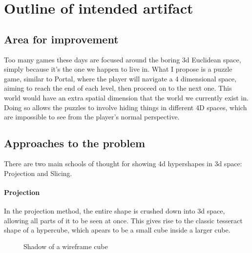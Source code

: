 \documentclass[12pt]{article}
\begin{document}
\maketitle

\section{Outline of intended artifact}
\subsection{Area for improvement}
Too many games these days are focused around the boring 3d Euclidean space, simply because it's the one we happen to live in.
What I propose is a puzzle game, similar to Portal, where the player will navigate a 4 dimensional space, aiming to reach the end of each level, then proceed on to the next one.
This world would have an extra spatial dimension that the world we currently exist in. 
Doing so allows the puzzles to involve hiding things in different 4D spaces, which are impossible to see from the player's normal perspective.

\subsection{Approaches to the problem}
There are two main schools of thought for showing 4d hypershapes in 3d space: Projection and Slicing. 
\paragraph{Projection}
In the projection method, the entire shape is crushed down into 3d space, allowing all parts of it to be seen at once. 
This gives rise to the classic tesseract shape of a hypercube, which apears to be a small cube inside a larger cube. \\

\begin{figure}
    \centering
    \caption{Shadow of a wireframe cube} \label{fig:CubeProjection}
\end{figure}
\end{document}
